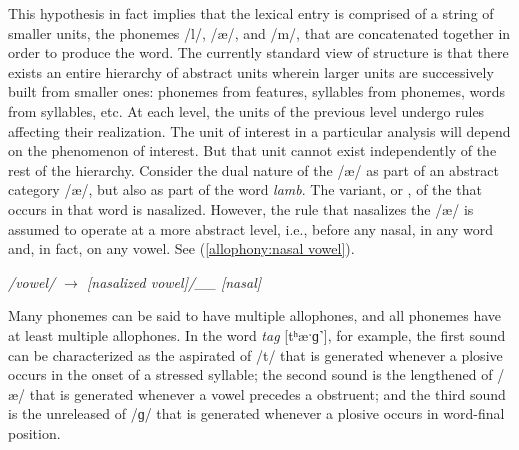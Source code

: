 This hypothesis in fact implies that the lexical entry is comprised
of a string of smaller units, the phonemes {/l/}, {/æ/},
and {/m/}, that are concatenated together in order to produce
the word. The currently standard view of  structure is
that there exists an entire hierarchy of abstract units wherein larger
units are successively built from smaller ones: phonemes from features,
syllables from phonemes, words from syllables, etc. At each level,
the units of the previous level undergo rules affecting their realization.
The unit of interest in a particular analysis will depend on the phenomenon
of interest. But that unit cannot exist independently of the rest
of the hierarchy. Consider the dual nature of the  {/æ/}
as part of an abstract category {/æ/}, but also as part
of the word \textit{lamb}. The variant, or , of the 
that occurs in that word is nasalized. However, the rule that nasalizes
the {/æ/} is assumed to operate at a more abstract level,
i.e., before any nasal, in any word and, in fact, on any
vowel. See (\ref{allophony:nasal vowel}). 
\begin{covexample}
\emph{\label{allophony:nasal vowel}/vowel/ $\rightarrow$ {[}nasalized
vowel{]}/\_\_ {[}nasal{]}}
\end{covexample}
Many phonemes can be said to have multiple  allophones,
and all phonemes have at least multiple  allophones. In the
word \textit{tag} {[tʰæˑɡ˺}{]}, for example, the first
sound can be characterized as the aspirated  of {/t/}
that is generated whenever a  plosive occurs in the onset
of a stressed syllable; the second sound is the lengthened 
of {/æ/} that is generated whenever a vowel precedes a 
obstruent; and the third sound is the unreleased  of {/ɡ/}
that is generated whenever a plosive occurs in word-final position. 

